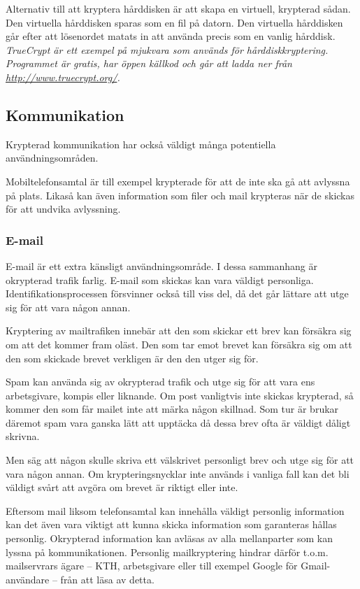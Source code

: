 \documentclass{article}
\begin{document}
		Alternativ till att kryptera hårddisken är att skapa en virtuell, krypterad sådan. Den virtuella hårddisken sparas som en fil på datorn. Den virtuella hårddisken går efter att lösenordet matats in att använda precis som en vanlig hårddisk.\\

		\emph{TrueCrypt är ett exempel på mjukvara som används för hårddiskkryptering. Programmet är gratis, har öppen källkod och går att ladda ner från \url{http://www.truecrypt.org/}.}

	\subsection {Kommunikation}

	Krypterad kommunikation har också väldigt många potentiella användningsområden.
	
	Mobiltelefonsamtal är till exempel krypterade för att de inte ska gå att avlyssna på plats. Likaså kan även information som filer och mail krypteras när de skickas för att undvika avlyssning.

		\subsubsection {E-mail}

		E-mail är ett extra känsligt användningsområde. I dessa sammanhang är okrypterad trafik farlig. E-mail som skickas kan vara väldigt personliga. Identifikationsprocessen försvinner också till viss del, då det går lättare att utge sig för att vara någon annan.

		Kryptering av mailtrafiken innebär att den som skickar ett brev kan försäkra sig om att det kommer fram oläst. Den som tar emot brevet kan försäkra sig om att den som skickade brevet verkligen är den den utger sig för.

		Spam kan använda sig av okrypterad trafik och utge sig för att vara ens arbetsgivare, kompis eller liknande. Om post vanligtvis inte skickas krypterad, så kommer den som får mailet inte att märka någon skillnad. Som tur är brukar däremot spam vara ganska lätt att upptäcka då dessa brev ofta är väldigt dåligt skrivna.

		Men säg att någon skulle skriva ett välskrivet personligt brev och utge sig för att vara någon annan. Om krypteringsnycklar inte används i vanliga fall kan det bli väldigt svårt att avgöra om brevet är riktigt eller inte.

		Eftersom mail liksom telefonsamtal kan innehålla väldigt personlig information kan det även vara viktigt att kunna skicka information som garanteras hållas personlig. Okrypterad information kan avläsas av alla mellanparter som kan lyssna på kommunikationen. Personlig mailkryptering hindrar därför t.o.m. mailservrars ägare -- KTH, arbetsgivare eller till exempel Google för Gmail-användare -- från att läsa av detta.\\
\end{document}
